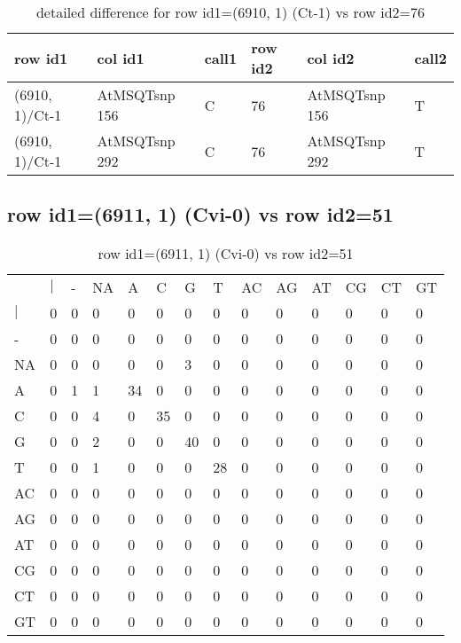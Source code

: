 \begin{center}
\begin{longtable}{|l|l|l|l|l|l|}
\caption{detailed difference for row id1=(6910, 1) (Ct-1) vs row id2=76} \label{table_dm83}\\
\hline
row id1&col id1&call1&row id2&col id2&call2\\
\hline
(6910, 1)/Ct-1&AtMSQTsnp 156&C&76&AtMSQTsnp 156&T\\
(6910, 1)/Ct-1&AtMSQTsnp 292&C&76&AtMSQTsnp 292&T\\
\hline
\end{longtable}
\end{center}

\subsection{row id1=(6911, 1) (Cvi-0) vs row id2=51}
\begin{center}
\begin{longtable}{|l|l|l|l|l|l|l|l|l|l|l|l|l|l|}
\caption{row id1=(6911, 1) (Cvi-0) vs row id2=51} \label{table_dm84}\\
\hline
\\
\hline
&$|$&-&NA&A&C&G&T&AC&AG&AT&CG&CT&GT\\
$|$&0&0&0&0&0&0&0&0&0&0&0&0&0\\
-&0&0&0&0&0&0&0&0&0&0&0&0&0\\
NA&0&0&0&0&0&3&0&0&0&0&0&0&0\\
A&0&1&1&34&0&0&0&0&0&0&0&0&0\\
C&0&0&4&0&35&0&0&0&0&0&0&0&0\\
G&0&0&2&0&0&40&0&0&0&0&0&0&0\\
T&0&0&1&0&0&0&28&0&0&0&0&0&0\\
AC&0&0&0&0&0&0&0&0&0&0&0&0&0\\
AG&0&0&0&0&0&0&0&0&0&0&0&0&0\\
AT&0&0&0&0&0&0&0&0&0&0&0&0&0\\
CG&0&0&0&0&0&0&0&0&0&0&0&0&0\\
CT&0&0&0&0&0&0&0&0&0&0&0&0&0\\
GT&0&0&0&0&0&0&0&0&0&0&0&0&0\\
\hline
\end{longtable}
\end{center}


